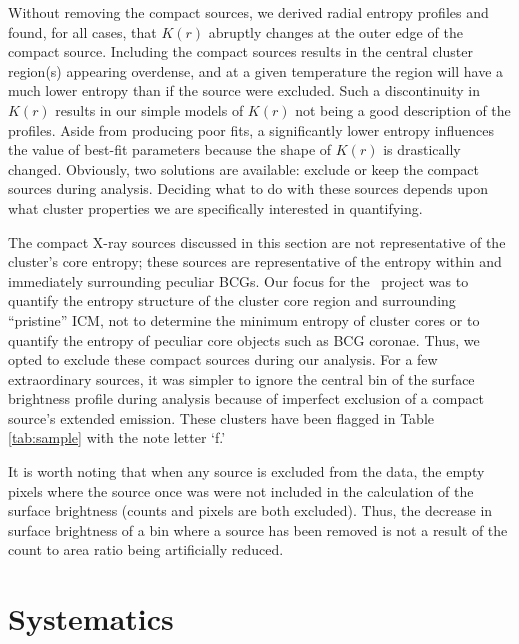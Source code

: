 \documentclass{emulateapj}
\begin{document}
Without removing the compact sources, we derived radial entropy
profiles and found, for all cases, that $K(r)$ abruptly changes at the
outer edge of the compact source. Including the compact sources
results in the central cluster region(s) appearing overdense, and at a
given temperature the region will have a much lower entropy than if
the source were excluded. Such a discontinuity in $K(r)$ results in
our simple models of $K(r)$ not being a good description of the
profiles. Aside from producing poor fits, a significantly lower
entropy influences the value of best-fit parameters because the shape
of $K(r)$ is drastically changed. Obviously, two solutions are
available: exclude or keep the compact sources during analysis.
Deciding what to do with these sources depends upon what cluster
properties we are specifically interested in quantifying.

The compact X-ray sources discussed in this section are not
representative of the cluster's core entropy; these sources are
representative of the entropy within and immediately surrounding
peculiar BCGs. Our focus for the \accept\ project was to quantify the
entropy structure of the cluster core region and surrounding
``pristine'' ICM, not to determine the minimum entropy of cluster
cores or to quantify the entropy of peculiar core objects such as BCG
coronae. Thus, we opted to exclude these compact sources during our
analysis. For a few extraordinary sources, it was simpler to ignore
the central bin of the surface brightness profile during analysis
because of imperfect exclusion of a compact source's extended
emission. These clusters have been flagged in Table \ref{tab:sample}
with the note letter `f.'

It is worth noting that when any source is excluded from the data, the
empty pixels where the source once was were not included in the
calculation of the surface brightness (counts and pixels are both
excluded). Thus, the decrease in surface brightness of a bin where a
source has been removed is not a result of the count to area ratio
being artificially reduced.

\section{Systematics}
\label{sec:sys}
\end{document}
